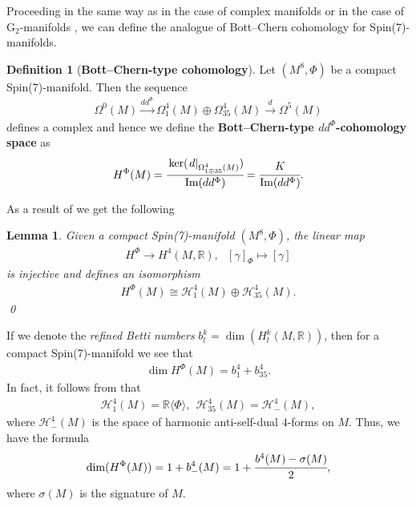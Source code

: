 \documentclass[10pt,a4paper,reqno]{article}
\newtheorem{lemma}[theorem]{Lemma}
\theoremstyle{definition}
\newtheorem{definition}[theorem]{Definition}
\numberwithin{equation}{section}
\def\bR{\mathbb R}
\def\G2{\mathrm{G}_2}
\def\ddphi{dd^{\Phi}}
\def\cH{\mathcal{H}}
\DeclareMathOperator{\Ima}{Im}
\begin{document}
Proceeding in the same way as in the case of complex manifolds \cite{bott-chern} or in the case of $\G2$-manifolds \cite[]{pacini-raferro-pluripotential}, we can define the analogue of Bott--Chern cohomology for Spin(7)-manifolds.

\medskip

\begin{definition}[\textbf{Bott--Chern-type cohomology}]\label{def:bot-chernspin7}
Let $(M^8, \Phi)$ be a compact Spin(7)-manifold. Then the sequence 
\begin{align*}
\Omega^0(M) \xrightarrow{\ddphi} \Omega^4_1(M) \oplus \Omega^4_{35}(M) \xrightarrow{d} \Omega^5(M)
\end{align*}
defines a complex and hence we define the \textbf{Bott--Chern-type $\ddphi$-cohomology space} as
\begin{align}\label{eq:bot-cherncoh}
H^{\Phi}(M) = \cfrac{\ker (\left.d\right|_{\Omega^4_{1\oplus 35}(M)})}{\Ima(\ddphi)} = \cfrac{K}{\Ima(\ddphi)}.
\end{align}
\end{definition}


As a result of  we get the following
\begin{lemma}\label{lem:Spin7coh}
Given a compact Spin(7)-manifold $(M^8, \Phi)$, the linear map 
\begin{align*}
 H^{\Phi} \rightarrow H^4(M, \bR),\ \ \ [\gamma]_{\Phi} \mapsto [\gamma]   \end{align*}
 is injective and defines an isomorphism
 \begin{align*}
H^{\Phi}(M)\cong \cH^4_1(M) \oplus \cH^4_{35}(M).                    
 \end{align*} \qed\end{lemma}


\medskip

If we denote the \emph{refined Betti numbers} $b^k_l=\dim(H^k_l(M, \bR))$, then for a compact Spin(7)-manifold we see that 
\begin{align*}
\dim H^{\Phi}(M) = b^4_1+b^{4}_{35}.
\end{align*}
In fact, it follows from \cite[]{joycebook} that
\begin{align*}
\cH^4_1(M)=\bR\langle \Phi \rangle,\ \ \cH^4_{35}(M) = \cH^4_{-}(M),
\end{align*}
where $\cH^4_{-}(M)$ is the space of harmonic anti-self-dual $4$-forms on $M$. Thus, we have the formula
\begin{align*}
\dim(H^{\Phi}(M)) = 1+b^4_{-}(M)=1+ \cfrac{b^4(M)-\sigma(M)}{2},
\end{align*}
where $\sigma(M)$ is the signature of $M$.
\end{document}
